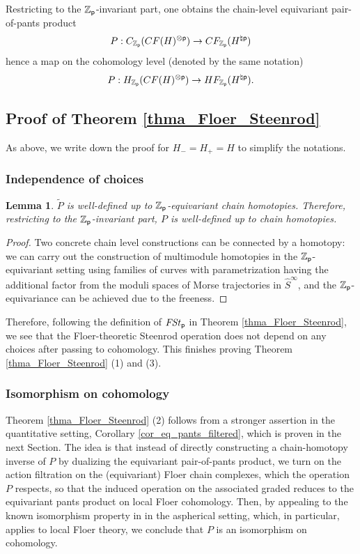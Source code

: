\documentclass[reqno, 10pt]{amsart}
\numberwithin{equation}{section}
\numberwithin{equation}{section}
\newtheorem{lemma}[thm]{Lemma}
\theoremstyle{definition}
\theoremstyle{remark}
\newcommand{\beqn}{\begin{equation*}}
\newcommand{\eeqn}{\end{equation*}}
\newcommand{\mb}{\mathbb}
\newcommand{\p}{{\sf p}}
\newcommand{\zp}{{{\mb Z}_{\sf p}}}
\newcommand{\fst}{{\it FSt}_{\p}}
\newcommand{\wt}{\widetilde}
\newcommand{\wh}{\widehat}
\begin{document}
Restricting to the $\zp$-invariant part, one obtains the chain-level equivariant pair-of-pants product
\beqn
P: C_{\zp}( CF(H)^{\otimes \p})  \to CF_{\zp}(H^{\natural \p})
\eeqn
hence a map on the cohomology level (denoted by the same notation)
\beqn
P: H_{\zp}(CF(H)^{\otimes \p}) \to HF_{\zp} (H^{\natural \p}).
\eeqn



\subsection{Proof of Theorem \ref{thma_Floer_Steenrod}}
As above, we write down the proof for $H_- = H_+ = H$ to simplify the notations.

\subsubsection{Independence of choices}

\begin{lemma}
$\wt P$ is well-defined up to $\zp$-equivariant chain homotopies. Therefore, restricting to the ${\mb Z}_\p$-invariant part, $P$ is well-defined up to chain homotopies.
\end{lemma}

\begin{proof}
Two concrete chain level constructions can be connected by a homotopy: we can carry out the construction of multimodule homotopies in the ${\mb Z}_\p$-equivariant setting using families of curves with parametrization having the additional factor from the moduli spaces of Morse trajectories in $\wh S^{\infty}$, and the ${\mb Z}_\p$-equivariance can be achieved due to the freeness.
\end{proof}

Therefore, following the definition of $\fst$ in Theorem \ref{thma_Floer_Steenrod}, we see that the Floer-theoretic Steenrod operation does not depend on any choices after passing to cohomology. This finishes proving Theorem \ref{thma_Floer_Steenrod} (1) and (3).

\subsubsection{Isomorphism on cohomology}
Theorem \ref{thma_Floer_Steenrod} (2) follows from a stronger assertion in the quantitative setting, Corollary \ref{cor_eq_pants_filtered}, which is proven in the next Section. The idea is that instead of directly constructing a chain-homotopy inverse of $P$ by dualizing the equivariant pair-of-pants product, we turn on the action filtration on the (equivariant) Floer chain complexes, which the operation $P$ respects, so that the induced operation on the associated graded reduces to the equivariant pants product on local Floer cohomology. Then, by appealing to the known isomorphism property in \cite{seidel-pants, shelukhin-zhao} in the aspherical setting, which, in particular, applies to local Floer theory, we conclude that $P$ is an isomorphism on cohomology.  
\end{document}
